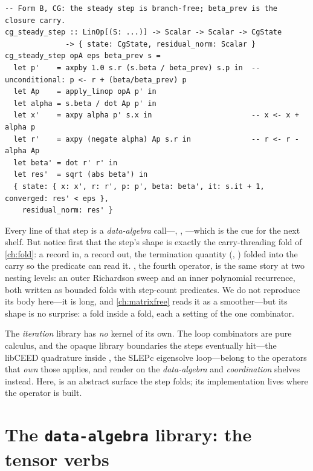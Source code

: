 \begin{lstlisting}[style=l4style]
-- Form B, CG: the steady step is branch-free; beta_prev is the closure carry.
cg_steady_step :: LinOp[(S: ...)] -> Scalar -> Scalar -> CgState
              -> { state: CgState, residual_norm: Scalar }
cg_steady_step opA eps beta_prev s =
  let p'    = axpby 1.0 s.r (s.beta / beta_prev) s.p in  -- unconditional: p <- r + (beta/beta_prev) p
  let Ap    = apply_linop opA p' in
  let alpha = s.beta / dot Ap p' in
  let x'    = axpy alpha p' s.x in                       -- x <- x + alpha p
  let r'    = axpy (negate alpha) Ap s.r in              -- r <- r - alpha Ap
  let beta' = dot r' r' in
  let res'  = sqrt (abs beta') in
  { state: { x: x', r: r', p: p', beta: beta', it: s.it + 1, converged: res' < eps },
    residual_norm: res' }
\end{lstlisting}
Every line of that step is a \emph{data-algebra} call---, ,
---which is the cue for the next shelf. But notice first that the step's
shape is exactly the carry-threading fold of \cref{ch:fold}: a record in, a record
out, the termination quantity (, ) folded into the
carry so the predicate can read it. , the fourth operator, is the
same story at two nesting levels: an outer Richardson sweep and an inner
polynomial recurrence, both written as bounded  folds
with step-count predicates. We do not reproduce its body here---it is long, and
\cref{ch:matrixfree} reads it as a smoother---but its shape is no surprise: a fold
inside a fold, each a setting of the one combinator.

\begin{notationbox}
The \emph{iteration} library has \emph{no}  kernel of its own. The
loop combinators are pure calculus, and the opaque library boundaries the steps
eventually hit---the libCEED quadrature inside , the SLEPc
eigensolve loop---belong to the operators that \emph{own} those applies, and render
 on the \emph{data-algebra} and \emph{coordination} shelves
instead. Here,  is an abstract surface the step folds; its
implementation lives where the operator is built.
\end{notationbox}

\section{The \texttt{data-algebra} library: the tensor verbs}
\label{sec:dataalgebra}

